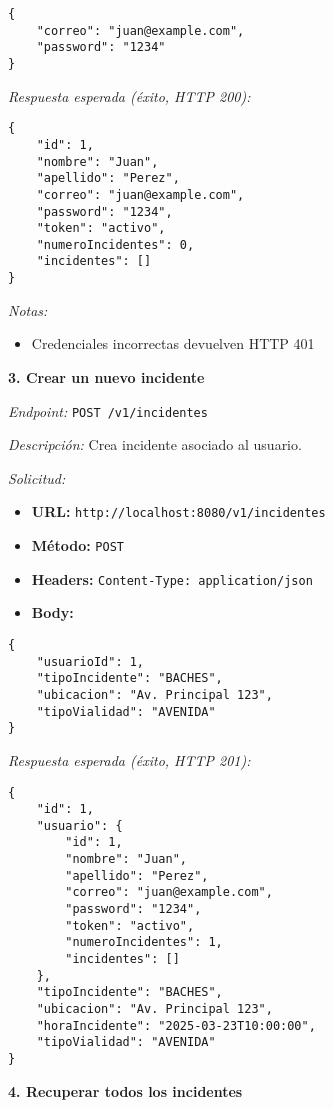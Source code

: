 \begin{lstlisting}
{
    "correo": "juan@example.com",
    "password": "1234"
}
\end{lstlisting}

\textit{Respuesta esperada (éxito, HTTP 200):}
\begin{lstlisting}
{
    "id": 1,
    "nombre": "Juan",
    "apellido": "Perez",
    "correo": "juan@example.com",
    "password": "1234",
    "token": "activo",
    "numeroIncidentes": 0,
    "incidentes": []
}
\end{lstlisting}

\textit{Notas:}
\begin{itemize}
    \item Credenciales incorrectas devuelven HTTP 401
\end{itemize}

\textbf{3. Crear un nuevo incidente}

\textit{Endpoint:} \texttt{POST /v1/incidentes}

\textit{Descripción:} Crea incidente asociado al usuario.

\textit{Solicitud:}
\begin{itemize}
    \item \textbf{URL:} \texttt{http://localhost:8080/v1/incidentes}
    \item \textbf{Método:} \texttt{POST}
    \item \textbf{Headers:} \texttt{Content-Type: application/json}
    \item \textbf{Body:}
\end{itemize}

\begin{lstlisting}
{
    "usuarioId": 1,
    "tipoIncidente": "BACHES",
    "ubicacion": "Av. Principal 123",
    "tipoVialidad": "AVENIDA"
}
\end{lstlisting}

\textit{Respuesta esperada (éxito, HTTP 201):}
\begin{lstlisting}
{
    "id": 1,
    "usuario": {
        "id": 1,
        "nombre": "Juan",
        "apellido": "Perez",
        "correo": "juan@example.com",
        "password": "1234",
        "token": "activo",
        "numeroIncidentes": 1,
        "incidentes": []
    },
    "tipoIncidente": "BACHES",
    "ubicacion": "Av. Principal 123",
    "horaIncidente": "2025-03-23T10:00:00",
    "tipoVialidad": "AVENIDA"
}
\end{lstlisting}

\textbf{4. Recuperar todos los incidentes}

